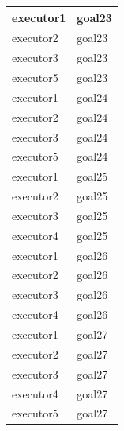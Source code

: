 \documentclass[12pt]{article}
\begin{document}
\begin{table}[H]
\begin{tabular}{|l|l|}
executor1 & goal23 \\ \hline
executor2 & goal23 \\ \hline
executor3 & goal23 \\ \hline
executor5 & goal23 \\ \hline
executor1 & goal24 \\ \hline
executor2 & goal24 \\ \hline
executor3 & goal24 \\ \hline
executor5 & goal24 \\ \hline
executor1 & goal25 \\ \hline
executor2 & goal25 \\ \hline
executor3 & goal25 \\ \hline
executor4 & goal25 \\ \hline
executor1 & goal26 \\ \hline
executor2 & goal26 \\ \hline
executor3 & goal26 \\ \hline
executor4 & goal26 \\ \hline
executor1 & goal27 \\ \hline
executor2 & goal27 \\ \hline
executor3 & goal27 \\ \hline
executor4 & goal27 \\ \hline
executor5 & goal27 \\ \hline
\end{tabular}
\end{table}
		
\end{document}
